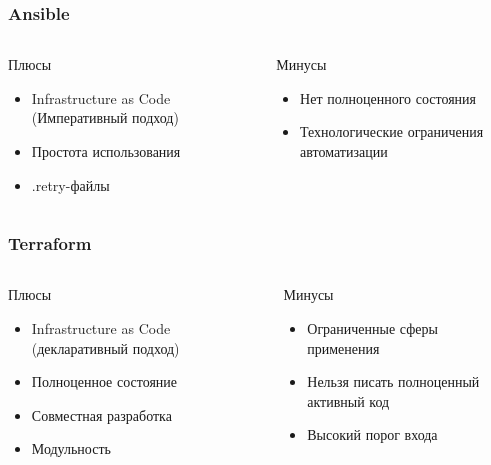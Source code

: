 \documentclass[mathserif,serif]{beamer}
\begin{document}
\begin{frame}
	\frametitle{Ansible}
	\begin{columns}[T]
		\begin{column}{.5\linewidth}
			\begin{minipage}[c][\textheight][c]{\linewidth}
          			Плюсы
				\begin{itemize}
					\item{Infrastructure as Code (Императивный подход)}
					\item{Простота использования}
					\item{.retry-файлы}
				\end{itemize}
			\end{minipage}
		\end{column}
		\begin{column}{.5\linewidth}
			\begin{minipage}[c][\textheight][c]{\linewidth}
          			Минусы
				\begin{itemize}
					\item{Нет полноценного состояния}
					\item{Технологические ограничения автоматизации}
				\end{itemize}
			\end{minipage}
		\end{column}
	\end{columns}
\end{frame}

\begin{frame}
	\frametitle{Terraform}
	\begin{columns}[T]
		\begin{column}{.5\linewidth}
			\begin{minipage}[c][\textheight][c]{\linewidth}
          			Плюсы
				\begin{itemize}
					\item{Infrastructure as Code (декларативный подход)}
					\item{Полноценное состояние}
					\item{Совместная разработка}
					\item{Модульность}
				\end{itemize}
			\end{minipage}
		\end{column}
		\begin{column}{.5\linewidth}
			\begin{minipage}[c][\textheight][c]{\linewidth}
          			Минусы
				\begin{itemize}
					\item{Ограниченные сферы применения}
					\item{Нельзя писать полноценный активный код}
					\item{Высокий порог входа}
				\end{itemize}
			\end{minipage}
		\end{column}
	\end{columns}
\end{frame}
\end{document}
